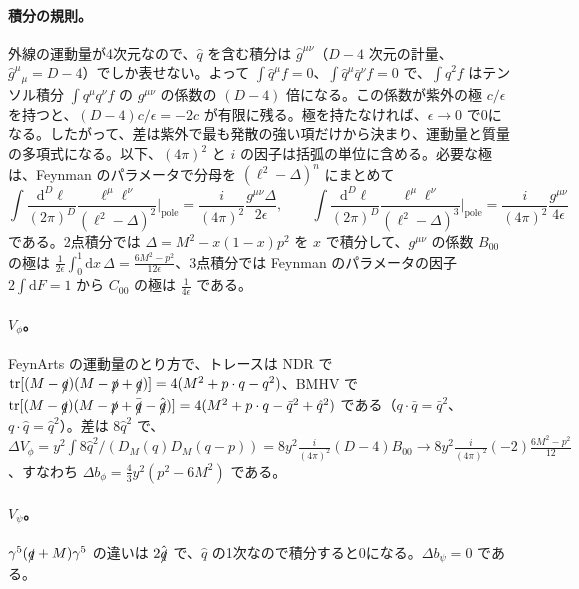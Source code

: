 \documentclass[a4paper,10pt]{ltjsarticle}
\newcommand{\dd}{\mathrm{d}}
\begin{document}
\paragraph{積分の規則。}外線の運動量が4次元なので、$\hat q$ を含む積分は $\hat g^{\mu\nu}$（$D-4$ 次元の計量、$\hat g^\mu{}_\mu=D-4$）でしか表せない。よって $\int\hat q^\mu f=0$、$\int\hat q^\mu\bar q^\nu f=0$ で、$\int\hat q^2f$ はテンソル積分 $\int q^\mu q^\nu f$ の $g^{\mu\nu}$ の係数の $(D-4)$ 倍になる。この係数が紫外の極 $c/\epsilon$ を持つと、$(D-4)c/\epsilon=-2c$ が有限に残る。極を持たなければ、$\epsilon\to0$ で0になる。したがって、差は紫外で最も発散の強い項だけから決まり、運動量と質量の多項式になる。以下、$(4\pi)^2$ と $i$ の因子は括弧の単位に含める。必要な極は、Feynman のパラメータで分母を $(\ell^2-\Delta)^n$ にまとめて
\begin{equation*}
\int\frac{\dd^D\ell}{(2\pi)^D}\frac{\ell^\mu\ell^\nu}{(\ell^2-\Delta)^2}\Big|_{\mathrm{pole}}=\frac{i}{(4\pi)^2}\frac{g^{\mu\nu}\Delta}{2\epsilon},\qquad
\int\frac{\dd^D\ell}{(2\pi)^D}\frac{\ell^\mu\ell^\nu}{(\ell^2-\Delta)^3}\Big|_{\mathrm{pole}}=\frac{i}{(4\pi)^2}\frac{g^{\mu\nu}}{4\epsilon}
\end{equation*}
である。2点積分では $\Delta=M^2-x(1-x)p^2$ を $x$ で積分して、$g^{\mu\nu}$ の係数 $B_{00}$ の極は $\frac{1}{2\epsilon}\int_0^1\dd x\,\Delta=\frac{6M^2-p^2}{12\epsilon}$、3点積分では Feynman のパラメータの因子 $2\int\dd F=1$ から $C_{00}$ の極は $\frac{1}{4\epsilon}$ である。

\paragraph{$V_\phi$。}FeynArts の運動量のとり方で、トレースは NDR で $\mathrm{tr}[(M-\slashed q)(M-\slashed p+\slashed q)]=4(M^2+p\cdot q-q^2)$、BMHV で $\mathrm{tr}[(M-\slashed q)(M-\slashed p+\bar{\slashed q}-\hat{\slashed q})]=4(M^2+p\cdot q-\bar q^2+\hat q^2)$ である（$q\cdot\bar q=\bar q^2$、$q\cdot\hat q=\hat q^2$）。差は $8\hat q^2$ で、$\Delta V_\phi=y^2\int8\hat q^2/(D_M(q)D_M(q-p))=8y^2\frac{i}{(4\pi)^2}(D-4)B_{00}\to8y^2\frac{i}{(4\pi)^2}(-2)\frac{6M^2-p^2}{12}$、すなわち $\Delta b_\phi=\frac43y^2(p^2-6M^2)$ である。

\paragraph{$V_\psi$。}$\gamma^5(\slashed q+M)\gamma^5$ の違いは $2\hat{\slashed q}$ で、$\hat q$ の1次なので積分すると0になる。$\Delta b_\psi=0$ である。
\end{document}
